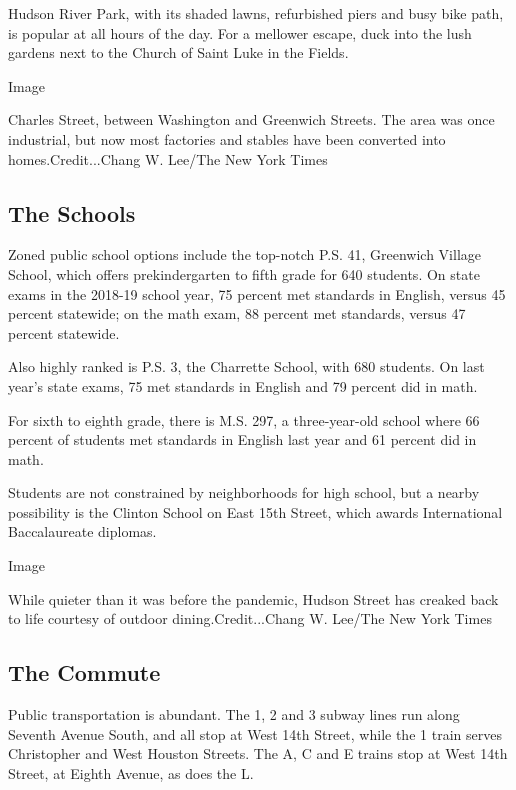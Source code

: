 Hudson River Park, with its shaded lawns, refurbished piers and busy
bike path, is popular at all hours of the day. For a mellower escape,
duck into the lush gardens next to the Church of Saint Luke in the
Fields.

Image

Charles Street, between Washington and Greenwich Streets. The area was
once industrial, but now most factories and stables have been converted
into homes.Credit...Chang W. Lee/The New York Times

\hypertarget{the-schools}{%
\subsection{The Schools}\label{the-schools}}

Zoned public school options include the top-notch P.S. 41, Greenwich
Village School, which offers prekindergarten to fifth grade for 640
students. On state exams in the 2018-19 school year, 75 percent met
standards in English, versus 45 percent statewide; on the math exam, 88
percent met standards, versus 47 percent statewide.

Also highly ranked is P.S. 3, the Charrette School, with 680 students.
On last year's state exams, 75 met standards in English and 79 percent
did in math.

For sixth to eighth grade, there is M.S. 297, a three-year-old school
where 66 percent of students met standards in English last year and 61
percent did in math.

Students are not constrained by neighborhoods for high school, but a
nearby possibility is the Clinton School on East 15th Street, which
awards International Baccalaureate diplomas.

Image

While quieter than it was before the pandemic, Hudson Street has creaked
back to life courtesy of outdoor dining.Credit...Chang W. Lee/The New
York Times

\hypertarget{the-commute}{%
\subsection{The Commute}\label{the-commute}}

Public transportation is abundant. The 1, 2 and 3 subway lines run along
Seventh Avenue South, and all stop at West 14th Street, while the 1
train serves Christopher and West Houston Streets. The A, C and E trains
stop at West 14th Street, at Eighth Avenue, as does the L.

